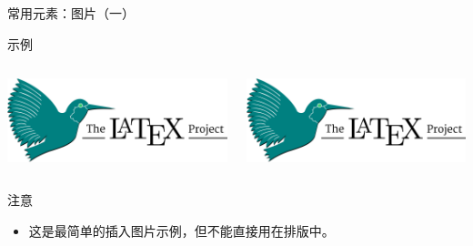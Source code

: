 \begin{frame}[fragile]{常用元素：图片（一）}
  \begin{exampleblock}{示例}
    \begin{columns}
      \begin{column}{0.6\textwidth}
        \begin{texcode}[gobble=10, moretexcs={\graphicspath,\includegraphics},emph={[1]figure}, emph={[2]graphicx}]
          \usepackage{graphicx}

          \includegraphics{figures/logo.png}
        \end{texcode}
      \end{column}

      \begin{column}{0.35\textwidth}
        \centering
        \includegraphics[width=1.0\textwidth]{logo.png}
      \end{column}
    \end{columns}
  \end{exampleblock}

  \begin{alertblock}{注意}
    \begin{itemize}
      \item 这是最简单的插入图片示例，但不能直接用在排版中。
    \end{itemize}
  \end{alertblock}
\end{frame}

